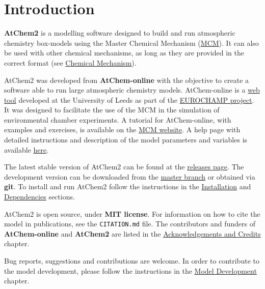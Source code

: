 %
%
%
%
\chapter{Introduction} \label{ch:introduction}

\textbf{AtChem2} is a modelling software designed to build and run
atmospheric chemistry box-models using the Master Chemical Mechanism
(\href{http://mcm.leeds.ac.uk/MCM/}{MCM}). It can also be used with
other chemical mechanisms, as long as they are provided in the correct
format (see \hyperref[sec:mechanism]{Chemical Mechanism}).

AtChem2 was developed from \textbf{AtChem-online} with the objective
to create a software able to run large atmospheric chemistry
models. AtChem-online is a
\href{https://atchem.leeds.ac.uk/webapp/}{web tool} developed at the
University of Leeds as part of the
\href{https://www.eurochamp.org/}{EUROCHAMP project}. It was designed
to facilitate the use of the MCM in the simulation of environmental
chamber experiments. A tutorial for AtChem-online, with examples and
exercises, is available on the
\href{http://mcm.leeds.ac.uk/MCMv3.3.1/atchem/tutorial_intro.htt}{MCM
  website}. A help page with detailed instructions and description of
the model parameters and variables is available
\href{https://atchem.leeds.ac.uk/webapp/run/help.html}{here}.

The latest stable version of AtChem2 can be found at the
\href{https://github.com/AtChem/AtChem2/releases}{releases page}. The
development version can be downloaded from the
\href{https://github.com/AtChem/AtChem2/archive/master.zip}{master
  branch} or obtained via \textbf{git}. To install and run AtChem2
follow the instructions in the \hyperref[sec:install]{Installation}
and \hyperref[sec:dependencies]{Dependencies} sections.

AtChem2 is open source, under \textbf{MIT license}. For information on
how to cite the model in publications, see the \verb|CITATION.md|
file. The contributors and funders of \textbf{AtChem-online} and
\textbf{AtChem2} are listed in the
\hyperref[ch:credits]{Acknowledgements and Credits} chapter.

Bug reports, suggestions and contributions are welcome. In order to
contribute to the model development, please follow the instructions in
the \hyperref[ch:development]{Model Development} chapter.
